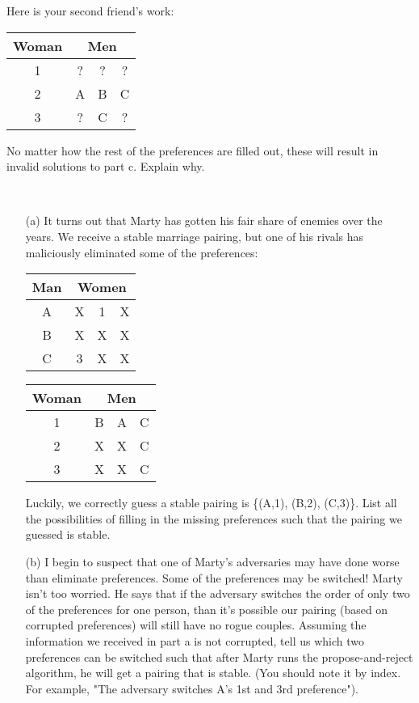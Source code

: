 \documentclass[11pt]{article}
\begin{document}
\begin{qunlist}
\begin{itemize}
Here is your second friend's work:

\begin{center}
\begin{tabular}{|c|ccc|}\hline 
Woman&\multicolumn{3}{|c|}{Men}\\\hline 
1&?&?&?\\\hline 
2&A&B&C\\\hline 
3&?&C&?\\\hline
\end{tabular}
\end{center}
 
 No matter how the rest of the preferences are filled out, these will result in invalid solutions to part c. Explain why.
\end{itemize} 
    



        
 \\
\begin{itemize}
\item[(a)] It turns out that Marty has gotten his fair share of enemies over the years. We receive a stable marriage pairing, but one of his rivals has maliciously eliminated some of the preferences:

\begin{center}
\begin{tabular}{|c|ccc|}\hline 
Man&\multicolumn{3}{|c|}{Women}\\\hline 
A&X&1&X\\\hline 
B&X&X&X\\\hline 
C&3&X&X\\\hline
\end{tabular} 
\hspace{2cm}
\begin{tabular}{|c|ccc|}\hline 
Woman&\multicolumn{3}{|c|}{Men}\\\hline 
1&B&A&C\\\hline 
2&X&X&C\\\hline 
3&X&X&C\\\hline
\end{tabular}
\end{center}
        
        Luckily, we correctly guess a stable pairing is \{(A,1), (B,2), (C,3)\}. List all the possibilities of filling in the missing preferences such that the pairing we guessed is stable. 
        
\item[(b)] I begin to suspect that one of Marty's adversaries may have done worse than eliminate preferences. Some of the preferences may be switched! Marty isn't too worried. He says that if the adversary switches the order of only two of the preferences for one person, than it's possible our pairing (based on corrupted preferences) will still have no rogue couples. Assuming the information we received in part a is not corrupted, tell us which two preferences can be switched such that after Marty runs the propose-and-reject algorithm, he will get a pairing that is stable. (You should note it by index. For example, "The adversary switches A's 1st and 3rd preference").
        

\end{itemize}
\end{qunlist}
\end{document}
